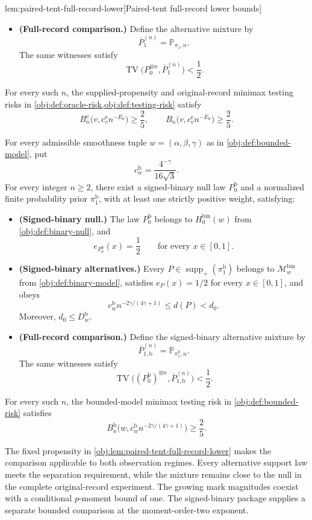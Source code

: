 \begin{lemmav}{lem:paired-tent-full-record-lower}[Paired-tent full-record lower bounds]
\begin{itemize}
\item \textbf{(Full-record comparison.)}
Define the alternative mixture by
\[
\overline P_1^{(n)}=\mathbb P_{\pi_1,n}.
\]
The same witnesses satisfy
\[
\operatorname{TV}\bigl(P_0^{\otimes n},\overline P_1^{(n)}\bigr)<\frac12.
\]
\end{itemize}
For every such \(n\), the supplied-propensity and original-record minimax testing risks in \cref{obj:def:oracle-risk,obj:def:testing-risk} satisfy
\[
B_n^{\mathrm e}\bigl(v,c^{\mathrm e}_v n^{-E_0}\bigr)\ge\frac25,
\qquad
B_n\bigl(v,c^{\mathrm e}_v n^{-E_0}\bigr)\ge\frac25.
\]

For every admissible smoothness tuple \(w=(\alpha,\beta,\gamma)\) as in \cref{obj:def:bounded-model}, put
\[
c_w^{\mathrm b}=\frac{4^{-\gamma}}{16\sqrt3}.
\]
For every integer \(n\ge2\), there exist a signed-binary null law \(P_0^{\mathrm b}\) and a normalized finite probability prior \(\pi_1^{\mathrm b}\), with at least one strictly positive weight, satisfying:
\begin{itemize}
\item \textbf{(Signed-binary null.)}
The law \(P_0^{\mathrm b}\) belongs to \(H_0^{\mathrm{bin}}(w)\) from \cref{obj:def:binary-null}, and
\[
e_{P_0^{\mathrm b}}(x)=\frac12
\qquad\text{for every }x\in[0,1].
\]

\item \textbf{(Signed-binary alternatives.)}
Every \(P\in\operatorname{supp}_+(\pi_1^{\mathrm b})\) belongs to \(\mathcal M^{\mathrm{bin}}_w\) from \cref{obj:def:binary-model}, satisfies \(e_P(x)=1/2\) for every \(x\in[0,1]\), and obeys
\[
c_w^{\mathrm b}n^{-2\gamma/(4\gamma+1)}
\le d(P)<d_0.
\]
Moreover, \(d_0\le D_w^{\mathrm b}\).

\item \textbf{(Full-record comparison.)}
Define the signed-binary alternative mixture by
\[
\overline P_{1,\mathrm b}^{(n)}
=\mathbb P_{\pi_1^{\mathrm b},n}.
\]
The same witnesses satisfy
\[
\operatorname{TV}\bigl((P_0^{\mathrm b})^{\otimes n},
\overline P_{1,\mathrm b}^{(n)}\bigr)<\frac12.
\]
\end{itemize}
For every such \(n\), the bounded-model minimax testing risk in \cref{obj:def:bounded-risk} satisfies
\[
B_n^{\mathrm b}\bigl(w,c_w^{\mathrm b}n^{-2\gamma/(4\gamma+1)}\bigr)
\ge\frac25.
\]
\end{lemmav}

The fixed propensity in \cref{obj:lem:paired-tent-full-record-lower} makes the comparison applicable to both observation regimes. Every alternative support law meets the separation requirement, while the mixture remains close to the null in the complete original-record experiment. The growing mark magnitudes coexist with a conditional \(p\)-moment bound of one. The signed-binary package supplies a separate bounded comparison at the moment-order-two exponent.

